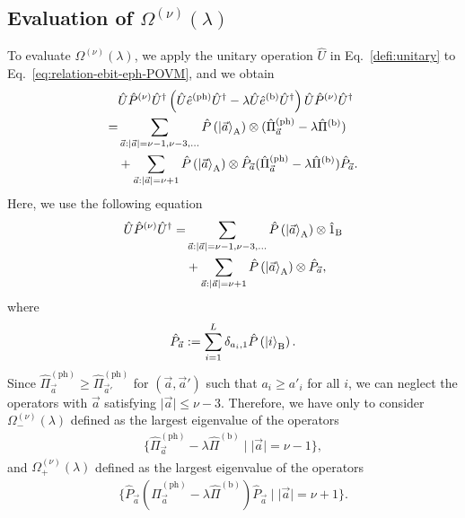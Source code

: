 \documentclass[twocolumn,superscriptaddress,pra,footinbib,notitlepage]{revtex4-1}
\newcommand{\1}{\mbox{1}\hspace{-0.25em}\mbox{l}}
\newcommand{\abs}[1]{\lvert#1\rvert}
\begin{document}
\subsection{Evaluation of $\Omega^{(\nu)}(\lambda)$}
\label{subsec:evaluation-omega}
To evaluate $\Omega^{(\nu)}(\lambda)$, we apply the unitary operation $\hat{U}$ in Eq.~\eqref{defi:unitary} to Eq.~\eqref{eq:relation-ebit-eph-POVM}, and we obtain~\cite{tamaki2012unconditional}
\begin{align}
&\hat{U}\hat{P}^{(\nu)}\hat{U}^\dagger\left(\hat{U}\hat{e}^{(\textrm{ph})}\hat{U}^\dagger-\lambda\hat{U}\hat{e}^{(\textrm{b})}\hat{U}^\dagger\right)\hat{U}\hat{P}^{(\nu)}\hat{U}^\dagger\nonumber\\
=&\sum_{\vec{a}:\abs{\vec{a}}=\nu-1, \nu-3, \dots}\hat{P}\left(\ket{\vec{a}}_\textrm{A}\right)\otimes(\hat{\Pi}_{\vec{a}}^{(\textrm{ph})}-\lambda\hat{\Pi}^{(\textrm{b})})\nonumber\\
&+\sum_{\vec{a}:\abs{\vec{a}}=\nu+1}\hat{P}\left(\ket{\vec{a}}_\textrm{A}\right)\otimes\hat{P}_{\vec{a}}(\hat{\Pi}_{\vec{a}}^{(\textrm{ph})}-\lambda\hat{\Pi}^{(\textrm{b})})\hat{P}_{\vec{a}}.
\end{align}
Here, we use the following equation
\begin{align}
\hat{U}\hat{P}^{(\nu)}\hat{U}^\dagger=&\sum_{\vec{a}: \abs{\vec{a}}=\nu-1, \nu-3, \dots}\hat{P}\left(\ket{\vec{a}}_\textrm{A}\right)\otimes\hat{1}_\textrm{B}\nonumber\\
&+\sum_{\vec{a}: \abs{\vec{a}}=\nu+1}\hat{P}\left(\ket{\vec{a}}_\textrm{A}\right)\otimes\hat{P}_{\vec{a}},
\end{align}
where
\begin{align}
\hat{P}_{\vec{a}}:=\sum_{i=1}^L\delta_{a_i, 1}\hat{P}\left(\ket{i}_\textrm{B}\right).
\end{align}
Since $\hat{\Pi}_{\vec{a}}^{(\textrm{ph})}\geq\hat{\Pi}_{\vec{a}'}^{(\textrm{ph})}$ for $(\vec{a}, \vec{a}')$ such that $a_i\geq a'_i$ for all $i$, we can neglect the operators with $\vec{a}$ satisfying $\abs{\vec{a}}\leq\nu-3$.
Therefore, we have only to consider $\Omega_{-}^{(\nu)}(\lambda)$ defined as the largest eigenvalue of the operators
\begin{align}
\{\hat{\Pi}_{\vec{a}}^{(\textrm{ph})}-\lambda\hat{\Pi}^{(\textrm{b})}\mid\abs{\vec{a}}=\nu-1\},\label{set:omegaminus}
\end{align}
and $\Omega_{+}^{(\nu)}(\lambda)$ defined as the largest eigenvalue of the operators
\begin{align}
\{\hat{P}_{\vec{a}}(\hat{\Pi}_{\vec{a}}^{(\textrm{ph})}-\lambda\hat{\Pi}^{(\textrm{b})})\hat{P}_{\vec{a}}\mid\abs{\vec{a}}=\nu+1\}.\label{set:omegaplus}
\end{align}
\end{document}
